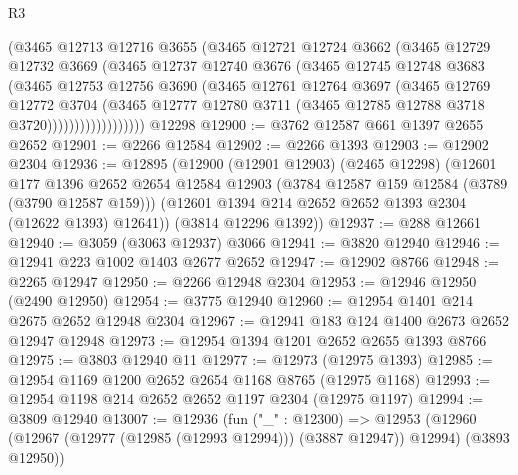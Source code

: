 \begin{lexlean}{R3}
\begin{coremodule}
                    (@3465
                      @12713
                      @12716
                      @3655
                      (@3465
                        @12721
                        @12724
                        @3662
                        (@3465
                          @12729
                          @12732
                          @3669
                          (@3465
                            @12737
                            @12740
                            @3676
                            (@3465
                              @12745
                              @12748
                              @3683
                              (@3465
                                @12753
                                @12756
                                @3690
                                (@3465
                                  @12761
                                  @12764
                                  @3697
                                  (@3465
                                    @12769
                                    @12772
                                    @3704
                                    (@3465
                                      @12777
                                      @12780
                                      @3711
                                      (@3465 @12785 @12788 @3718 @3720))))))))))))))))))
    @12298
@12900 := @3762 @12587 @661 @1397 @2655 @2652
@12901 := @2266 @12584
@12902 := @2266 @1393
@12903 := @12902 @2304
@12936 := @12895
    (@12900
      (@12901 @12903)
      (@2465 @12298)
      (@12601
        @177
        @1396
        @2652
        @2654
        @12584
        @12903
        (@3784 @12587 @159 @12584 (@3789 (@3790 @12587 @159)))
        (@12601 @1394 @214 @2652 @2652 @1393 @2304 (@12622 @1393) @12641))
      (@3814 @12296 @1392))
@12937 := @288 @12661
@12940 := @3059 (@3063 @12937) @3066
@12941 := @3820 @12940
@12946 := @12941 @223 @1002 @1403 @2677 @2652
@12947 := @12902 @8766
@12948 := @2265 @12947
@12950 := @2266 @12948 @2304
@12953 := @12946 @12950 (@2490 @12950)
@12954 := @3775 @12940
@12960 := @12954 @1401 @214 @2675 @2652 @12948 @2304
@12967 := @12941 @183 @124 @1400 @2673 @2652 @12947 @12948
@12973 := @12954 @1394 @1201 @2652 @2655 @1393 @8766
@12975 := @3803 @12940 @11
@12977 := @12973 (@12975 @1393)
@12985 := @12954 @1169 @1200 @2652 @2654 @1168 @8765 (@12975 @1168)
@12993 := @12954 @1198 @214 @2652 @2652 @1197 @2304 (@12975 @1197)
@12994 := @3809 @12940
@13007 := @12936
    (fun ("_" : @12300) =>
    @12953 (@12960 (@12967 (@12977 (@12985 (@12993 @12994))) (@3887 @12947)) @12994) (@3893 @12950))

\end{coremodule}
\end{lexlean}
